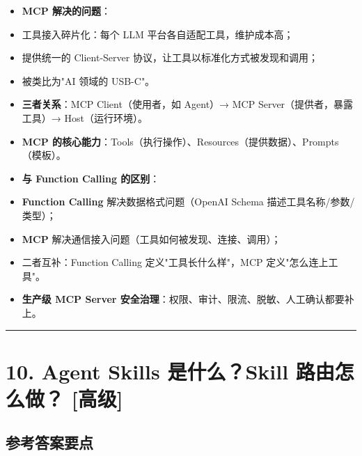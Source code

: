 \documentclass[9pt,a4paper,twocolumn]{ctexart}
\newcommand{\lvgao}{\usebox{\badgegaobox}}
\def\lvgao{[高级]}%
\begin{document}
\begin{itemize}[itemsep=1pt, topsep=2pt]
  \item \textbf{MCP 解决的问题}：
  \item 工具接入碎片化：每个 LLM 平台各自适配工具，维护成本高；
  \item 提供统一的 Client-Server 协议，让工具以标准化方式被发现和调用；
  \item 被类比为"AI 领域的 USB-C"。
  \item \textbf{三者关系}：MCP Client（使用者，如 Agent）→ MCP Server（提供者，暴露工具）→ Host（运行环境）。
  \item \textbf{MCP 的核心能力}：Tools（执行操作）、Resources（提供数据）、Prompts（模板）。
  \item \textbf{与 Function Calling 的区别}：
  \item \textbf{Function Calling} 解决数据格式问题（OpenAI Schema 描述工具名称/参数/类型）；
  \item \textbf{MCP} 解决通信接入问题（工具如何被发现、连接、调用）；
  \item 二者互补：Function Calling 定义"工具长什么样"，MCP 定义"怎么连上工具"。
  \item \textbf{生产级 MCP Server 安全治理}：权限、审计、限流、脱敏、人工确认都要补上。
\end{itemize}


\vspace{2pt}
\noindent\rule{\columnwidth}{0.3pt}\vspace{2pt}



\section*{10. Agent Skills 是什么？Skill 路由怎么做？ \lvgao{}}


\subsection*{参考答案要点}
\end{document}
